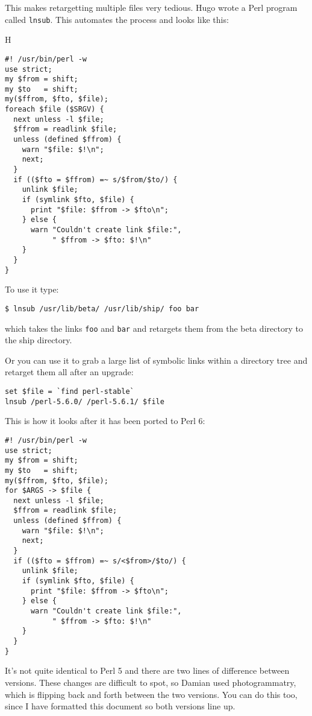 \documentclass{article}
\newenvironment{example}
  {\addtolength{\linewidth}{-\parindent}%
   \null\begin{minipage}{\linewidth}}
  {\end{minipage}\addtolength{\linewidth}{\parindent}\null}
\begin{document}
This makes retargetting multiple files very tedious.  Hugo wrote a Perl
program called \verb'lnsub'.  This automates the process and looks like
this:

\clearpage
\begin{example}
\hspace{-10in}\mbox{H}
\begin{verbatim}
#! /usr/bin/perl -w
use strict;
my $from = shift;
my $to   = shift;
my($ffrom, $fto, $file);
foreach $file ($SRGV) {
  next unless -l $file;
  $ffrom = readlink $file;
  unless (defined $ffrom) {
    warn "$file: $!\n";
    next;
  }
  if (($fto = $ffrom) =~ s/$from/$to/) {
    unlink $file;
    if (symlink $fto, $file) {
      print "$file: $ffrom -> $fto\n";
    } else {
      warn "Couldn't create link $file:",
           " $ffrom -> $fto: $!\n"
    }
  }
}

\end{verbatim}
\end{example}

To use it type: 

\verb'$ lnsub /usr/lib/beta/ /usr/lib/ship/ foo bar'

\noindent
which takes the links \verb'foo' and \verb'bar' and retargets them
from the beta directory to the ship directory.

Or you can use it to grab a large list of symbolic links 
within a directory tree and retarget them all after an upgrade:

\begin{verbatim}
set $file = `find perl-stable`
lnsub /perl-5.6.0/ /perl-5.6.1/ $file
\end{verbatim}

\clearpage
\begin{example}
This is how it looks after it has been ported to Perl 6:
\begin{verbatim}
#! /usr/bin/perl -w
use strict;
my $from = shift;
my $to   = shift;
my($ffrom, $fto, $file);
for $ARGS -> $file {
  next unless -l $file;
  $ffrom = readlink $file;
  unless (defined $ffrom) {
    warn "$file: $!\n";
    next;
  }
  if (($fto = $ffrom) =~ s/<$from>/$to/) {
    unlink $file;
    if (symlink $fto, $file) {
      print "$file: $ffrom -> $fto\n";
    } else {
      warn "Couldn't create link $file:",
           " $ffrom -> $fto: $!\n"
    }
  }
}

\end{verbatim}
\end{example}

It's not quite identical to Perl 5 and there are two lines of difference
between versions.  These changes are difficult to spot, so Damian used
photogrammatry, which is flipping back and forth between the two
versions.  You can do this too, since I have formatted this document so
both versions line up.    
\end{document}
